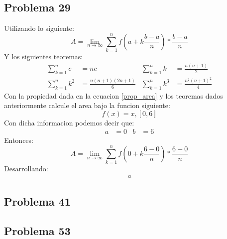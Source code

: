 \documentclass{article}
\begin{document}
      \subsection{Problema 29}
        Utilizando lo siguiente:
        \begin{equation} \label{prop_area}
          A = \lim_{n\to\infty} \sum_{k=1}^{n} f\left(a+k\frac{b-a}{n}\right)* \frac{b-a}{n}
        \end{equation}
        Y los siguientes teoremas:
        \begin{align*}
          \sum_{k=1}^{n} c &= nc & \sum_{k=1}^{n} k &= \frac{n(n+1)}{2} \\ \sum_{k=1}^{n} k^2 &= \frac{n(n+1)(2n+1)}{6} & \sum_{k=1}^{n} k^3 &= \frac{n^2(n+1)^2}{4}
        \end{align*}
        Con la propiedad dada en la ecuacion \ref{prop_area} y los teoremas dados anteriormente calcule el area bajo la funcion siguiente:
        \begin{equation}
          f(x) = x, [0,6]
        \end{equation}
        Con dicha informacion podemos decir que:
        \begin{align*}
          a &= 0 & b &= 6
        \end{align*}
        Entonces:
        \begin{equation}
          A = \lim_{n\to\infty} \sum_{k=1}^{n} f\left(0+k\frac{6-0}{n}\right)* \frac{6-0}{n}
        \end{equation}
        Desarrollando:
        \begin{align*}
          a
        \end{align*}
      \subsection{Problema 41}
      \subsection{Problema 53}
\end{document}
